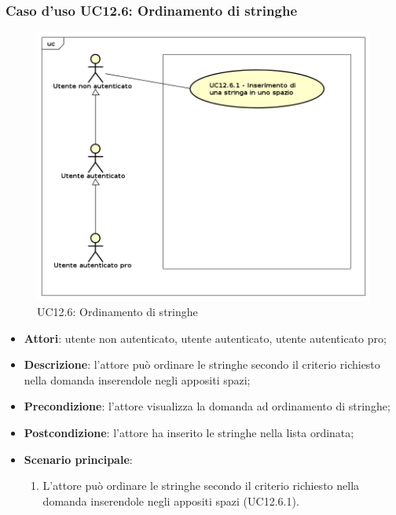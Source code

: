 \subsubsection{Caso d'uso UC12.6: Ordinamento di stringhe}
\label{UC12.6}
\begin{figure}[h]
	\centering
	\includegraphics[scale=0.5]{UML/UC12_6.png}
	\caption{UC12.6: Ordinamento di stringhe}
\end{figure}
\begin{itemize}
\item \textbf{Attori}: utente non autenticato, utente autenticato, utente autenticato pro;
\item \textbf{Descrizione}: l'attore può ordinare le stringhe secondo il criterio richiesto nella domanda inserendole negli appositi spazi;
\item \textbf{Precondizione}: l'attore visualizza la domanda ad ordinamento di stringhe;
\item \textbf{Postcondizione}: l'attore ha inserito le stringhe nella lista ordinata;
\item \textbf{Scenario principale}:
\begin{enumerate}
\item L'attore può ordinare le stringhe secondo il criterio richiesto nella domanda inserendole negli appositi spazi (UC12.6.1).
\end{enumerate} 
\end{itemize}

\newpage

